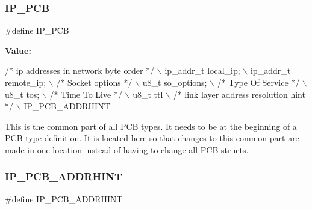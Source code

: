 \subsubsection{\texorpdfstring{I\+P\+\_\+\+P\+CB}{IP\_PCB}}
{\footnotesize\ttfamily \#define I\+P\+\_\+\+P\+CB}

{\bfseries Value\+:}
\begin{DoxyCode}
\textcolor{comment}{/* ip addresses in network byte order */} \(\backslash\)
  ip\_addr\_t local\_ip; \(\backslash\)
  ip\_addr\_t remote\_ip; \(\backslash\)
   \textcolor{comment}{/* Socket options */}  \(\backslash\)
  u8\_t so\_options;      \(\backslash\)
   \textcolor{comment}{/* Type Of Service */} \(\backslash\)
  u8\_t tos;              \(\backslash\)
  \textcolor{comment}{/* Time To Live */}     \(\backslash\)
  u8\_t ttl               \(\backslash\)
  \textcolor{comment}{/* link layer address resolution hint */} \(\backslash\)
  IP\_PCB\_ADDRHINT
\end{DoxyCode}
This is the common part of all P\+CB types. It needs to be at the beginning of a P\+CB type definition. It is located here so that changes to this common part are made in one location instead of having to change all P\+CB structs. \mbox{\label{openmote-cc2538_2lwip_2src_2include_2lwip_2ip_8h_a19a7497f9c87e25b66382e1b92f56382}} 
\subsubsection{\texorpdfstring{I\+P\+\_\+\+P\+C\+B\+\_\+\+A\+D\+D\+R\+H\+I\+NT}{IP\_PCB\_ADDRHINT}}
{\footnotesize\ttfamily \#define I\+P\+\_\+\+P\+C\+B\+\_\+\+A\+D\+D\+R\+H\+I\+NT}

\mbox{\label{openmote-cc2538_2lwip_2src_2include_2lwip_2ip_8h_a441c63f00c4b0cb69fc34ca6b55307cc}} 
